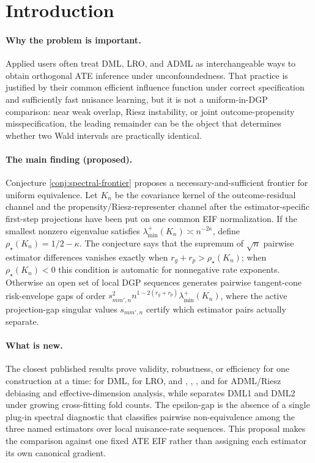 \documentclass[11pt]{article}
\theoremstyle{definition}
\theoremstyle{plain}
\theoremstyle{remark}
\begin{document}
\section{Introduction}
\paragraph{Why the problem is important.}
Applied users often treat DML, LRO, and ADML as interchangeable ways to obtain
orthogonal ATE inference under unconfoundedness.  That practice is justified by
their common efficient influence function under correct specification and
sufficiently fast nuisance learning, but it is not a uniform-in-DGP comparison:
near weak overlap, Riesz instability, or joint outcome-propensity
misspecification, the leading remainder can be the object that determines
whether two Wald intervals are practically identical.

\paragraph{The main finding (proposed).}
Conjecture \ref{conj:spectral-frontier} proposes a necessary-and-sufficient
frontier for uniform equivalence.  Let \(K_n\) be the covariance kernel of the
outcome-residual channel and the propensity/Riesz-representer channel after the
estimator-specific first-step projections have been put on one common EIF
normalization.  If the smallest nonzero eigenvalue satisfies
\(\lambda_{\min}^+(K_n)\asymp n^{-2\kappa}\), define
\(\rho_\star(K_n)=1/2-\kappa\).  The conjecture says that the
supremum of \(\sqrt n\) pairwise estimator differences vanishes exactly when
\(r_g+r_p>\rho_\star(K_n)\); when \(\rho_\star(K_n)<0\) this condition is
automatic for nonnegative rate exponents.  Otherwise an open set of local DGP
sequences generates pairwise tangent-cone risk-envelope gaps of order
\(s_{mm',n}^2n^{1-2(r_g+r_p)}\lambda_{\min}^+(K_n)\), where the active
projection-gap singular values \(s_{mm',n}\) certify which estimator pairs
actually separate.

\paragraph{What is new.}
The closest published results prove validity, robustness, or efficiency for one
construction at a time: \citet{ChernozhukovEtAl2018DML} for DML,
\citet{ChernozhukovEscancianoIchimuraNeweyRobins2022LRO} for LRO, and
\citet{ChernozhukovNeweySingh2022ADML},
\citet{ChernozhukovNeweySingh2022RR},
\citet{ChernozhukovNeweyQuintasMartinezSyrgkanis2024RieszRegression}, and
\citet{Singh2024KRRR} for ADML/Riesz debiasing and effective-dimension
analysis, while \citet{Velez2024DML} separates DML1 and DML2 under growing
cross-fitting fold counts.  The epsilon-gap is the absence of a single plug-in spectral
diagnostic that classifies pairwise non-equivalence among the three named
estimators over local nuisance-rate sequences.  This proposal makes the
comparison against one fixed ATE EIF rather than assigning each estimator its
own canonical gradient.
\end{document}

